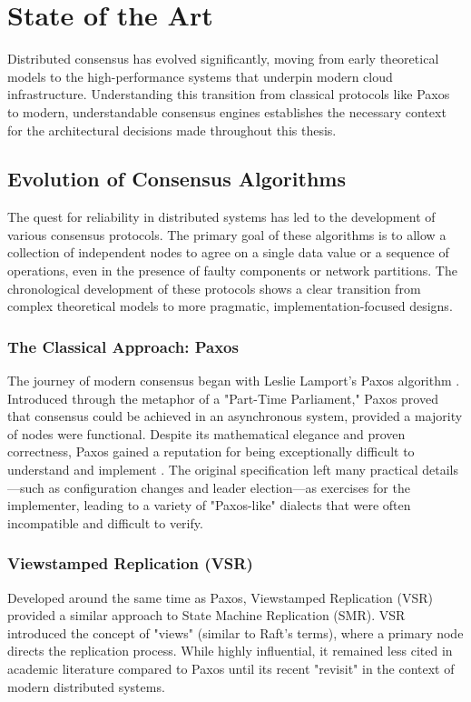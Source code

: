 \chapter{State of the Art}
\label{ch:state_of_the_art}

Distributed consensus has evolved significantly, moving from early theoretical models to the high-performance systems that underpin modern cloud infrastructure. Understanding this transition from classical protocols like Paxos to modern, understandable consensus engines establishes the necessary context for the architectural decisions made throughout this thesis.

\section{Evolution of Consensus Algorithms}
The quest for reliability in distributed systems has led to the development of various consensus protocols.
The primary goal of these algorithms is to allow a collection of independent nodes to agree on a single data value or a sequence of operations, even in the presence of faulty components or network partitions.
The chronological development of these protocols shows a clear transition from complex theoretical models to more pragmatic, implementation-focused designs.

\subsection{The Classical Approach: Paxos}
The journey of modern consensus began with Leslie Lamport's Paxos algorithm \cite{Lamport1998}.
Introduced through the metaphor of a "Part-Time Parliament," Paxos proved that consensus could be achieved in an asynchronous system, provided a majority of nodes were functional.
Despite its mathematical elegance and proven correctness, Paxos gained a reputation for being exceptionally difficult to understand and implement \cite{PaxosSimple}.
The original specification left many practical details—such as configuration changes and leader election—as exercises for the implementer, leading to a variety of "Paxos-like" dialects that were often incompatible and difficult to verify.

\subsection{Viewstamped Replication (VSR)}
Developed around the same time as Paxos, Viewstamped Replication (VSR) \cite{LiskovVSR} provided a similar approach to State Machine Replication (SMR).
VSR introduced the concept of "views" (similar to Raft's terms), where a primary node directs the replication process.
While highly influential, it remained less cited in academic literature compared to Paxos until its recent "revisit" in the context of modern distributed systems.

